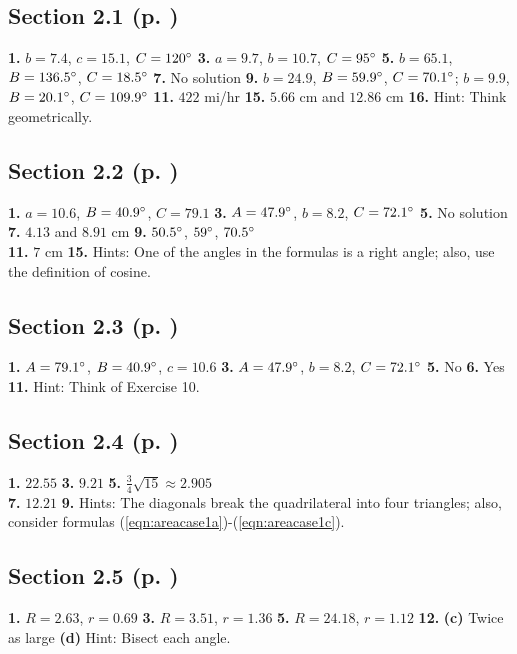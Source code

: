 \begin{multicols}{2}
\subsection*{Section 2.1 (p. \pageref{sec2dot1})}
\textbf{1.} $b = 7.4$, $c = 15.1$, $C = 120^\circ$ \quad \textbf{3.} $a = 9.7$, $b = 10.7$, $C =
95^\circ$ \quad \textbf{5.} $b = 65.1$, $B = 136.5^\circ$, $C = 18.5^\circ$ \quad
\textbf{7.} No solution \quad \textbf{9.} $b = 24.9$, $B = 59.9^\circ$, $C = 70.1^\circ$;
$b = 9.9$, $B = 20.1^\circ$, $C = 109.9^\circ$ \quad \textbf{11.} $422$ mi/hr \quad \textbf{15.}
$5.66$ cm and $12.86$ cm \quad \textbf{16.} Hint: Think geometrically.
\subsection*{Section 2.2 (p. \pageref{sec2dot2})}
\textbf{1.} $a = 10.6$, $B = 40.9^\circ$, $C = 79.1$ \quad \textbf{3.} $A = 47.9^\circ$,
$b = 8.2$, $C = 72.1^\circ$ \quad \textbf{5.} No solution \quad \textbf{7.} $4.13$ and $8.91$ cm
\quad \textbf{9.} $50.5^\circ$, $59^\circ$, $70.5^\circ$\\\textbf{11.} $7$ cm \quad
\textbf{15.} Hints: One of the angles in the formulas is a right angle; also, use the definition of
cosine.
\subsection*{Section 2.3 (p. \pageref{sec2dot3})}
\textbf{1.} $A = 79.1^\circ$, $B = 40.9^\circ$, $c = 10.6$ \quad \textbf{3.} $A = 47.9^\circ$,
$b = 8.2$, $C = 72.1^\circ$ \quad \textbf{5.} No \quad \textbf{6.} Yes \quad \textbf{11.} Hint:
Think of Exercise 10.
\subsection*{Section 2.4 (p. \pageref{sec2dot4})}
\textbf{1.} $22.55$ \quad \textbf{3.} $9.21$ \quad \textbf{5.} $\frac{3}{4}\sqrt{15}
\approx 2.905$\\\textbf{7.} $12.21$ \quad \textbf{9.} Hints: The diagonals break the quadrilateral
into four triangles; also, consider formulas (\ref{eqn:areacase1a})-(\ref{eqn:areacase1c}).
\subsection*{Section 2.5 (p. \pageref{sec2dot5})}
\textbf{1.} $R = 2.63$, $r = 0.69$ \quad \textbf{3.} $R = 3.51$, $r = 1.36$ \quad
\textbf{5.} $R = 24.18$, $r = 1.12$ \quad \textbf{12.} \textbf{(c)} Twice as large
\textbf{(d)} Hint: Bisect each angle.

\end{multicols}
